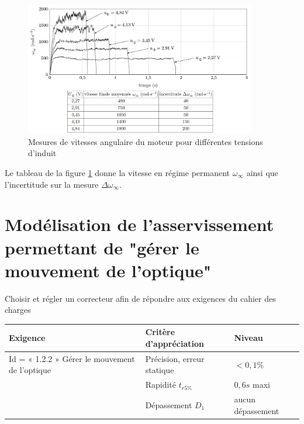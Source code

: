 \begin{figure}[!htb]
\begin{center}
\includegraphics[width=0.9\textwidth]{images/image_fig13.jpg}
\caption{Mesures de vitesses angulaire du moteur pour différentes tensions d’induit \label{fig13}}
\end{center}
\end{figure}




Le tableau de la figure \ref{fig13} donne la vitesse en régime permanent $\omega_{\infty}$ ainsi que l'incertitude sur la mesure $\Delta \omega_{\infty}$.






\section{Modélisation de l'asservissement permettant de "gérer le mouvement de l'optique"}

\begin{obj}
Choisir et régler un correcteur afin de répondre aux exigences du cahier des charges
\end{obj}

\begin{tabular}{|p{}|p{}|p{}|}
\hline 
\textbf{Exigence} & \textbf{Critère d'appréciation} & \textbf{Niveau} \\ 
\hline 
Id = « 1.2.2 » Gérer le mouvement de l'optique & Précision, erreur statique & $<0,1\%$ \\ 
\cline{2-3}
& Rapidité $t_{r5\%}$ & $0,6s$ maxi \\ 
\cline{2-3}
& Dépassement $D_1$ & aucun dépassement \\ 
\hline 
\end{tabular} 



